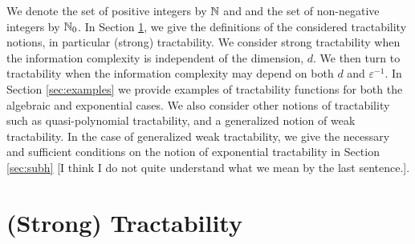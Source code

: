 \documentclass[sort&compress]{elsarticle}
\newcommand{\peter}[1]{\begingroup\color{violet}#1\endgroup}
\newcommand{\kachi}[1]{\begingroup\color{ForestGreen}#1\endgroup}
\begin{document}
\kachi{We denote the set of positive integers by $\mathbb{N}$ and and the set of non-negative integers by $\mathbb{N}_0$.}
In Section \ref{sec:spt}, we give the definitions of the considered tractability notions, in particular (strong) tractability. We consider strong tractability when the information complexity is independent of the dimension, $d$. We then turn to tractability  when the information complexity \peter{may depend on both} $d$ and $\varepsilon^{-1}$. In Section \ref{sec:examples} we provide examples of \peter{tractability functions} for both the algebraic and exponential cases. We also consider other notions of tractability such as quasi-polynomial tractability, and a generalized notion of weak tractability. In the case of generalized weak tractability, we give the necessary and sufficient conditions on the notion of exponential tractability in Section \ref{sec:subh} \peter{[I think I do not quite understand what we mean by the last sentence.]}. 

\section{(Strong) Tractability}\label{sec:spt}
\end{document}
